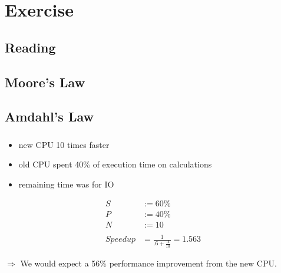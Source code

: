 \documentclass[]{scrartcl}
\newcommand{\exercise}{Exercise \thesection}
\begin{document}
\section*{\exercise}
\subsection{Reading}
\subsection{Moore's Law}
\subsubsection{}

\subsection{Amdahl's Law}
\subsubsection{}
\begin{itemize}
    \item new CPU 10 times faster
    \item old CPU spent 40\% of execution time on calculations
    \item remaining time was for IO
\end{itemize}
\begin{align}
    S &:= 60\%\\
    P &:= 40\%\\
    N &:= 10\\\nonumber\\
    Speedup &= \frac{1}{.6+\frac{.4}{10}} = 1.563
\end{align}

$\Rightarrow$ We would expect a 56\% performance improvement from the new CPU\@.
\end{document}
